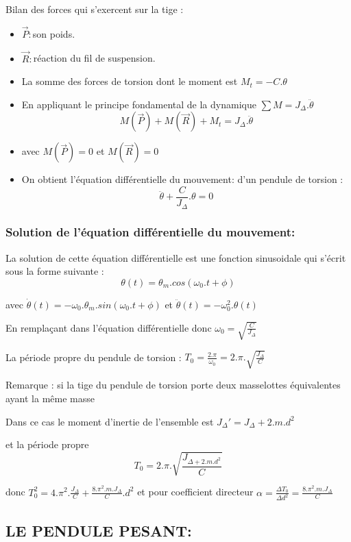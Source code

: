 \documentclass[12pt]{article}
\begin{document}
Bilan des forces qui s'exercent sur la tige :
\begin{itemize}

	\item $\vec{P}:$son poids.
	\item $\vec{R}:$réaction du fil de suspension.
	\item La somme des forces de torsion dont le moment est $M_t = -C.\theta$
	\item En appliquant le principe fondamental de la dynamique $\sum M = J_{\Delta}.\ddot{\theta}$
		$$M(\vec{P}) + M(\vec{R}) + M_t = J_{\Delta}.\ddot{\theta}$$
	\item avec $M(\vec{P}) = 0$ et $M(\vec{R}) = 0 $
	\item On obtient l'équation différentielle du mouvement: d'un pendule de torsion : $$\ddot{\theta} + \frac{C}{J_{\Delta}}.\theta = 0$$
\end{itemize}

\subsubsection{Solution de l'équation différentielle du mouvement: }
La solution de cette équation différentielle est une fonction sinusoidale qui s'écrit sous la forme suivante :
 $$\theta(t) = \theta_m.cos(\omega_0.t + \phi)$$ 

 avec  $\dot{\theta}(t) = -\omega_0.\theta_m.sin(\omega_0.t + \phi)$
  et $\ddot{\theta}(t) = -\omega_0^2.\theta(t)$

  En remplaçant dans l'équation différentielle donc $\omega_0 = \sqrt{\frac{C}{J_{\Delta}}}$

  La période propre du pendule de torsion : $T_0  = \frac{2.\pi}{\omega_0} = 2.\pi.\sqrt{\frac{J_{\Delta}}{C}}$

  \begin{tcolorbox}
Remarque : si la tige du pendule de torsion porte deux masselottes équivalentes ayant la même masse

Dans ce cas le moment d'inertie de l'ensemble est $J_{\Delta}'  = J_{\Delta} + 2.m.d^2$

et la période propre $$T_0 = 2.\pi.\sqrt{\frac{J_{\Delta + 2.m.d^2}}{C}}$$

donc $T_0^2 = 4.\pi^2.\frac{J_{\Delta}}{C} + \frac{8.\pi^2.m.J_{\Delta}}{C}.d^2$
et pour coefficient directeur $\alpha = \frac{\Delta{T_0}}{\Delta{d^2}} = \frac{8.\pi^2.m.J_{\Delta}}{C}$
  \end{tcolorbox}

  \subsection{LE PENDULE PESANT:}
\end{document}
